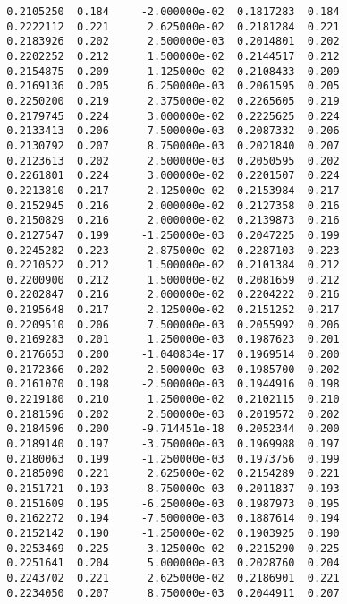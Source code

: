 \documentclass[
  letterpaper,
  DIV=11,
  numbers=noendperiod]{scrartcl}
\begin{document}
\begin{verbatim}
  0.2105250  0.184     -2.000000e-02  0.1817283  0.184           
  0.2222112  0.221      2.625000e-02  0.2181284  0.221           
  0.2183926  0.202      2.500000e-03  0.2014801  0.202           
  0.2202252  0.212      1.500000e-02  0.2144517  0.212           
  0.2154875  0.209      1.125000e-02  0.2108433  0.209           
  0.2169136  0.205      6.250000e-03  0.2061595  0.205           
  0.2250200  0.219      2.375000e-02  0.2265605  0.219           
  0.2179745  0.224      3.000000e-02  0.2225625  0.224           
  0.2133413  0.206      7.500000e-03  0.2087332  0.206           
  0.2130792  0.207      8.750000e-03  0.2021840  0.207           
  0.2123613  0.202      2.500000e-03  0.2050595  0.202           
  0.2261801  0.224      3.000000e-02  0.2201507  0.224           
  0.2213810  0.217      2.125000e-02  0.2153984  0.217           
  0.2152945  0.216      2.000000e-02  0.2127358  0.216           
  0.2150829  0.216      2.000000e-02  0.2139873  0.216           
  0.2127547  0.199     -1.250000e-03  0.2047225  0.199           
  0.2245282  0.223      2.875000e-02  0.2287103  0.223           
  0.2210522  0.212      1.500000e-02  0.2101384  0.212           
  0.2200900  0.212      1.500000e-02  0.2081659  0.212           
  0.2202847  0.216      2.000000e-02  0.2204222  0.216           
  0.2195648  0.217      2.125000e-02  0.2151252  0.217           
  0.2209510  0.206      7.500000e-03  0.2055992  0.206           
  0.2169283  0.201      1.250000e-03  0.1987623  0.201           
  0.2176653  0.200     -1.040834e-17  0.1969514  0.200           
  0.2172366  0.202      2.500000e-03  0.1985700  0.202           
  0.2161070  0.198     -2.500000e-03  0.1944916  0.198           
  0.2219180  0.210      1.250000e-02  0.2102115  0.210           
  0.2181596  0.202      2.500000e-03  0.2019572  0.202           
  0.2184596  0.200     -9.714451e-18  0.2052344  0.200           
  0.2189140  0.197     -3.750000e-03  0.1969988  0.197           
  0.2180063  0.199     -1.250000e-03  0.1973756  0.199           
  0.2185090  0.221      2.625000e-02  0.2154289  0.221           
  0.2151721  0.193     -8.750000e-03  0.2011837  0.193           
  0.2151609  0.195     -6.250000e-03  0.1987973  0.195           
  0.2162272  0.194     -7.500000e-03  0.1887614  0.194           
  0.2152142  0.190     -1.250000e-02  0.1903925  0.190           
  0.2253469  0.225      3.125000e-02  0.2215290  0.225           
  0.2251641  0.204      5.000000e-03  0.2028760  0.204           
  0.2243702  0.221      2.625000e-02  0.2186901  0.221           
  0.2234050  0.207      8.750000e-03  0.2044911  0.207           

\end{verbatim}
\end{document}
